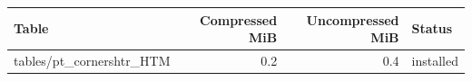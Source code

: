 {\small
\begin{tabular}{lrrl}
\hline
Table & Compressed MiB & Uncompressed MiB & Status \\
\hline
tables/pt\_cornershtr\_HTM & 0.2 & 0.4 & installed \\
\hline
\end{tabular}
}
